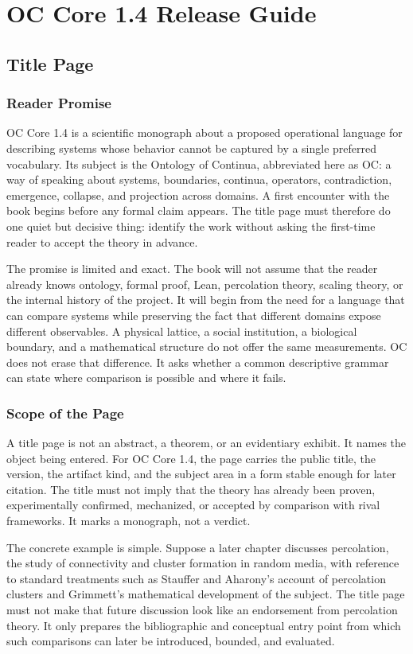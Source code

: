\documentclass[11pt,a4paper,openany]{book}
\begin{document}
\chapter{OC Core 1.4 Release Guide}
\section{Title Page}
\subsection{Reader Promise}
OC Core 1.4 is a scientific monograph about a proposed operational language for describing systems whose behavior cannot be captured by a single preferred vocabulary. Its subject is the Ontology of Continua, abbreviated here as OC: a way of speaking about systems, boundaries, continua, operators, contradiction, emergence, collapse, and projection across domains. A first encounter with the book begins before any formal claim appears. The title page must therefore do one quiet but decisive thing: identify the work without asking the first-time reader to accept the theory in advance. \cite{stauffer_percolation,grimmett_percolation}\par
The promise is limited and exact. The book will not assume that the reader already knows ontology, formal proof, Lean, percolation theory, scaling theory, or the internal history of the project. It will begin from the need for a language that can compare systems while preserving the fact that different domains expose different observables. A physical lattice, a social institution, a biological boundary, and a mathematical structure do not offer the same measurements. OC does not erase that difference. It asks whether a common descriptive grammar can state where comparison is possible and where it fails.\par
\subsection{Scope of the Page}
A title page is not an abstract, a theorem, or an evidentiary exhibit. It names the object being entered. For OC Core 1.4, the page carries the public title, the version, the artifact kind, and the subject area in a form stable enough for later citation. The title must not imply that the theory has already been proven, experimentally confirmed, mechanized, or accepted by comparison with rival frameworks. It marks a monograph, not a verdict. \cite{stauffer_percolation,grimmett_percolation}\par
The concrete example is simple. Suppose a later chapter discusses percolation, the study of connectivity and cluster formation in random media, with reference to standard treatments such as Stauffer and Aharony's account of percolation clusters and Grimmett's mathematical development of the subject. The title page must not make that future discussion look like an endorsement from percolation theory. It only prepares the bibliographic and conceptual entry point from which such comparisons can later be introduced, bounded, and evaluated.\par
\end{document}
